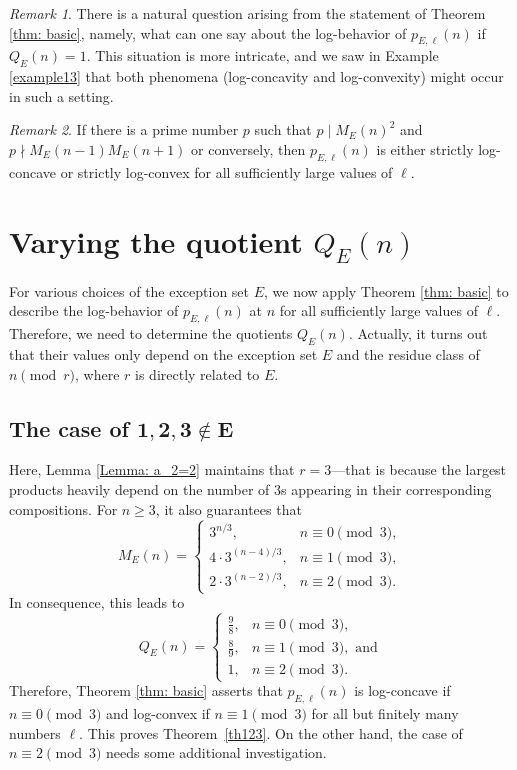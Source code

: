 \documentclass[12pt]{amsart}
\theoremstyle{definition}
\theoremstyle{remark}
\newtheorem*{remark}{Remark}
\numberwithin{theorem}{section} \numberwithin{equation}{section}
\begin{document}
\begin{remark}
There is a natural question arising from the statement of Theorem \ref{thm: basic}, namely, what can one say about the log-behavior of $p_{E,\ell }(n)$ if $Q_E(n)=1.$ This situation is more intricate, and we
saw in Example \ref{example13} that both phenomena (log-concavity and log-convexity) might occur in such a setting. 
\end{remark}




\begin{remark}
If there is a prime number $p$ such that $p\mid M_E(n)^2 $ and $p\nmid M_E(n-1)M_E(n+1)$ or conversely, then $p_{E,\ell }(n)$ is either strictly log-concave or strictly log-convex for all sufficiently large values of $\ell$.
\end{remark}


\section{Varying the
quotient $Q_{E}(n)$}

For various choices of the exception set $E$, we now apply Theorem \ref{thm: basic} to describe the log-behavior of $p_{E,\ell }(n)$ at $n$ for all sufficiently large values of $\ell$. Therefore, we need to determine the quotients
$Q_{E}(n)$. Actually, it turns out that their values only depend on the
exception set $E$ and the residue class of $n \pmod{r}$, where $r$ is
directly related to $E$.


\subsection{The case of $\mathbf{1,2,3 \not\in E} $}
\label{subsection S=(1,2,3)}

Here, Lemma \ref{Lemma: a_2=2} maintains that  
$r=3$---that is because the largest products heavily depend on the number
of $3$s appearing in their corresponding compositions. For $n\geq3$, it also guarantees that
\[
M_{E}\left( n\right)
=\left\{
\begin{array}{ll}
3^{n/3}, & n\equiv 0\pmod{3}, \\
4 \cdot 3^{(n-4)/3}, & n\equiv 1\pmod{3}, \\
2 \cdot 3^{(n-2)/3}, & n\equiv 2\pmod{3}.
\end{array}
\right.
\]
In consequence, this leads to
\begin{equation*}
Q_{E}\left( n\right) = \left\{
\begin{array}{ll}
\frac{9}{8}, & n\equiv 0\pmod{3}, \\
\frac{8}{9}, & n\equiv 1\pmod{3}, \text{ and} \\
1, & n\equiv 2\pmod{3}.
\end{array}
\right.
\end{equation*}
Therefore, Theorem \ref{thm: basic} asserts that $p_{E,\ell }(n)$ is log-concave if $n\equiv0\pmod{3}$ and log-convex if $n\equiv1\pmod{3}$ for all but finitely many numbers $\ell$.
This proves Theorem~\ref{th123}.
On the other hand, the case of $n\equiv 2 \pmod{3}$ needs some additional investigation.
\end{document}
